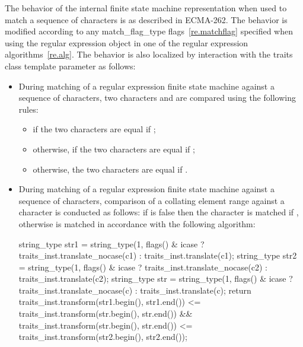\pnum
{}%
The behavior of the internal finite state machine representation when used to match a
sequence of characters is as described in ECMA-262.
The behavior is modified according
to any match_flag_type flags~\ref{re.matchflag} specified when using the regular expression
object in one of the regular expression algorithms~\ref{re.alg}. The behavior is also
localized by interaction with the traits class template parameter as follows:
\begin{itemize}
\item During matching of a regular expression finite state machine
against a sequence of characters, two characters 
and  are compared using the following rules:
\begin{itemize}
\item if  the two characters are equal
if ;
%
%
\item otherwise, if  the
two characters are equal if
;
%
%
%
\item otherwise, the two characters are equal if .
\end{itemize}

\item During matching of a regular expression finite state machine
against a sequence of characters, comparison of a collating element
range  against a character  is
conducted as follows: if  is false then the character  is matched if , otherwise  is matched in
accordance with the following algorithm:

%
%
%
%
%
%
\begin{codeblock}
string_type str1 = string_type(1,
  flags() & icase ?
    traits_inst.translate_nocase(c1) : traits_inst.translate(c1);
string_type str2 = string_type(1,
  flags() & icase ?
    traits_inst.translate_nocase(c2) : traits_inst.translate(c2);
string_type str = string_type(1,
  flags() & icase ?
    traits_inst.translate_nocase(c) : traits_inst.translate(c);
return traits_inst.transform(str1.begin(), str1.end())
      <= traits_inst.transform(str.begin(), str.end())
  && traits_inst.transform(str.begin(), str.end())
      <= traits_inst.transform(str2.begin(), str2.end());
\end{codeblock}


\end{itemize}
